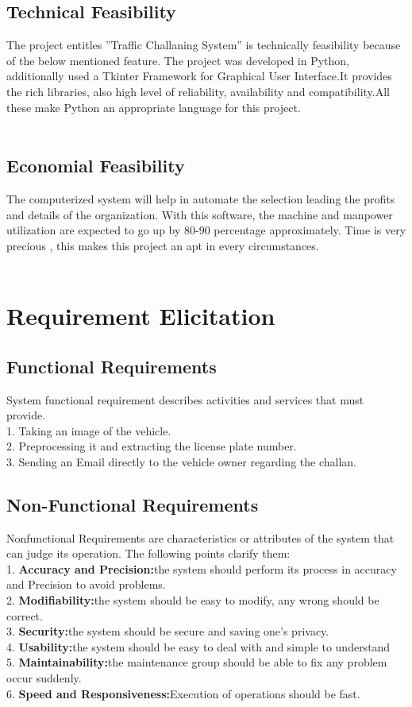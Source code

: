 \documentclass[12pt,a4paper]{report}
\begin{document}
\subsection{Technical Feasibility}The project entitles ”Traffic Challaning System” is technically feasibility because of the below mentioned feature. The project was developed in Python, additionally used a Tkinter Framework for Graphical User Interface.It provides the rich libraries, also high level of reliability, availability and compatibility.All these make Python an appropriate language for this project. \\\\
\subsection{ Economial Feasibility}
The computerized system will help in automate the selection leading the profits and details of the organization.  With this software, the machine and manpower utilization are expected to go up by 80-90 percentage approximately. Time is very precious , this makes this project an apt in every circumstances.\\\\
\newpage
\section{Requirement Elicitation}
\subsection{\Large Functional Requirements}
System functional requirement describes activities and services that must\\ provide.\\
1. Taking an image of the vehicle.\\
2. Preprocessing it and extracting the license plate number.\\
3. Sending an Email directly to the vehicle owner regarding the challan.\\
\subsection{Non-Functional Requirements}
Nonfunctional Requirements are characteristics or attributes of the system that can judge its operation. The following points clarify them:\\
1. \textbf{Accuracy and Precision:}the system should perform its process in accuracy and Precision to avoid problems.\\
2. \textbf{Modifiability:}the system should be easy to modify, any wrong should be correct.\\
3. \textbf{Security:}the system should be secure and saving one's privacy.
\\
4. \textbf{Usability:}the system should be easy to deal with and simple to understand\\
5. \textbf{Maintainability:}the maintenance group should be able to fix any problem occur suddenly.\\
6. \textbf{Speed and Responsiveness:}Execution of operations should be fast.
\end{document}
